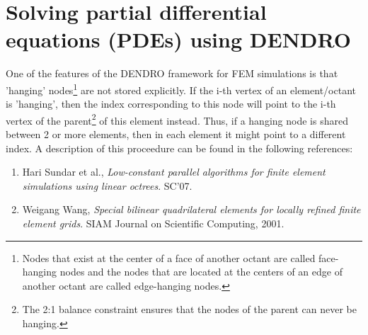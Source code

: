\documentclass[10pt,reqno,a4paper]{report}
\numberwithin{equation}{section}
\begin{document}
\chapter{Solving partial differential equations (PDEs) using DENDRO}
\label{chp:fem}
One of the features of the DENDRO framework for FEM simulations is that 'hanging' nodes\footnote{Nodes that exist at the center of a face of another octant are called face-hanging nodes and the nodes that are located at the centers of an edge of another octant are called edge-hanging nodes.} are not stored explicitly. If the i-th vertex of an element/octant is 'hanging', then the index corresponding to this node will point to the i-th vertex of the parent\footnote{The 2:1 balance constraint ensures that the nodes of the parent can never be hanging.} of this element instead. Thus, if a hanging node is shared between 2 or more elements, then in each element it might point to a different index. A description of this proceedure can be found in the following references:
\begin{enumerate}
\item Hari Sundar et al., \textit{Low-constant parallel algorithms for finite element simulations using linear octrees}. SC'07.
\item Weigang Wang, \textit{Special bilinear quadrilateral elements for locally refined finite element grids}. SIAM Journal on Scientific Computing, 2001.
\end{enumerate}
\end{document}
